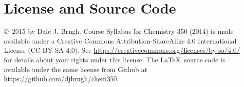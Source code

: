 \documentclass[letterpaper,oneside,onecolumn,11pt,article]{memoir}
\begin{document}
\section{License and Source Code}
\copyright\ 2015 by Dale J. Brugh. Course Syllabus for Chemistry 350 (2014) is made available under a Creative Commons Attribution-ShareAlike 4.0 International License (CC BY-SA 4.0). See \href{https://creativecommons.org/licenses/by-sa/4.0/}{https://creativecommons.org/licenses/by-sa/4.0/} for details about your rights under this license. The \LaTeX\ source code is available under the same license from Github at \href{https://github.com/djbrugh/chem350}{https://github.com/djbrugh/chem350}. 
\end{document}

